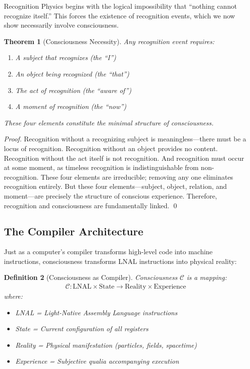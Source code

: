 \documentclass[12pt,a4paper]{article}
\newtheorem{theorem}{Theorem}[section]
\newtheorem{definition}[theorem]{Definition}
\newcommand{\conscious}{\mathcal{C}}
\begin{document}
Recognition Physics begins with the logical impossibility that ``nothing cannot recognize itself.'' This forces the existence of recognition events, which we now show necessarily involve consciousness.

\begin{theorem}[Consciousness Necessity]
Any recognition event requires:
\begin{enumerate}
\item A subject that recognizes (the ``I'')
\item An object being recognized (the ``that'')
\item The act of recognition (the ``aware of'')
\item A moment of recognition (the ``now'')
\end{enumerate}
These four elements constitute the minimal structure of consciousness.
\end{theorem}

\begin{proof}
Recognition without a recognizing subject is meaningless—there must be a locus of recognition. Recognition without an object provides no content. Recognition without the act itself is not recognition. And recognition must occur at some moment, as timeless recognition is indistinguishable from non-recognition. These four elements are irreducible; removing any one eliminates recognition entirely. But these four elements—subject, object, relation, and moment—are precisely the structure of conscious experience. Therefore, recognition and consciousness are fundamentally linked. \qed
\end{proof}

\subsection{The Compiler Architecture}

Just as a computer's compiler transforms high-level code into machine instructions, consciousness transforms LNAL instructions into physical reality:

\begin{definition}[Consciousness as Compiler]
Consciousness $\conscious$ is a mapping:
\begin{align}
\conscious: \text{LNAL} \times \text{State} \to \text{Reality} \times \text{Experience}
\end{align}
where:
\begin{itemize}
\item LNAL = Light-Native Assembly Language instructions
\item State = Current configuration of all registers
\item Reality = Physical manifestation (particles, fields, spacetime)
\item Experience = Subjective qualia accompanying execution
\end{itemize}
\end{definition}
\end{document}
